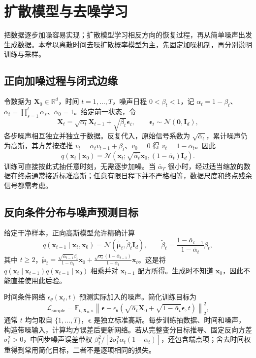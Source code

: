 \setcounter{chapter}{20} %
\chapter{扩散模型与去噪学习}
\label{chap:dl-diffusion}
把数据逐步加噪容易实现；扩散模型学习相反方向的恢复过程，再从简单噪声出发生成数据。本章以离散时间去噪扩散概率模型为主\cite{ho2020}，先固定加噪机制，再分别说明训练与采样。

\section{正向加噪过程与闭式边缘}
令数据为 $\mathbf X_0\in\mathbb R^d$，时间 $t=1,\ldots,T$，噪声日程 $0<\beta_t<1$，记 $\alpha_t=1-\beta_t$、$\bar\alpha_t=\prod_{s=1}^t\alpha_s$、$\bar\alpha_0=1$。给定前一状态，令
\[
\mathbf X_t=\sqrt{\alpha_t}\mathbf X_{t-1}+\sqrt{\beta_t}\boldsymbol\epsilon_t,
\qquad \boldsymbol\epsilon_t\sim\mathcal N(\mathbf0,\mathbf I_d),
\]
各步噪声相互独立并独立于数据。反复代入，原始信号系数为 $\sqrt{\bar\alpha_t}$，累计噪声仍为高斯，其方差按递推 $v_t=\alpha_tv_{t-1}+\beta_t$、$v_0=0$ 得 $v_t=1-\bar\alpha_t$。因此
\begin{equation}
q(\mathbf x_t\mid\mathbf x_0)=\mathcal N(\mathbf x_t;\sqrt{\bar\alpha_t}\mathbf x_0,(1-\bar\alpha_t)\mathbf I_d).
\label{eq:dl-diffusion-forward}
\end{equation}
训练可直接按此式抽任意时刻，无需逐步加噪。当 $\bar\alpha_T$ 很小时，经过适当缩放的数据在终点通常接近标准高斯；任意有限日程下并不严格相等，数据尺度和终点残余信号都需考虑。

\section{反向条件分布与噪声预测目标}
给定干净样本，正向高斯模型允许精确计算
\[
q(\mathbf x_{t-1}\mid\mathbf x_t,\mathbf x_0)=\mathcal N(\widetilde{\boldsymbol\mu}_t,\widetilde\beta_t\mathbf I_d),\qquad
\widetilde\beta_t=\frac{1-\bar\alpha_{t-1}}{1-\bar\alpha_t}\beta_t,
\]
其中 $t\geq2$，$\widetilde{\boldsymbol\mu}_t=\frac{\sqrt{\bar\alpha_{t-1}}\beta_t}{1-\bar\alpha_t}\mathbf x_0+\frac{\sqrt{\alpha_t}(1-\bar\alpha_{t-1})}{1-\bar\alpha_t}\mathbf x_t$。这是将 $q(\mathbf x_t\mid\mathbf x_{t-1})q(\mathbf x_{t-1}\mid\mathbf x_0)$ 相乘并对 $\mathbf x_{t-1}$ 配方所得。生成时不知道 $\mathbf x_0$，因此不能直接使用此后验。

时间条件网络 $\epsilon_\theta(\mathbf x_t,t)$ 预测实际加入的噪声。简化训练目标为
\begin{equation}
\mathcal L_{\mathrm{simple}}=\mathbb E_{t,\mathbf X_0,\boldsymbol\epsilon}
\left\|\boldsymbol\epsilon-\epsilon_\theta(\sqrt{\bar\alpha_t}\mathbf X_0+\sqrt{1-\bar\alpha_t}\boldsymbol\epsilon,t)\right\|_2^2,
\label{eq:dl-diffusion-loss}
\end{equation}
通常 $t$ 均匀取自 $\{1,\ldots,T\}$，$\boldsymbol\epsilon$ 是独立标准高斯。每步训练抽数据、时间和噪声，构造带噪输入，计算均方误差后更新网络。若从完整变分目标推导、固定反向方差 $\sigma_t^2>0$，中间步噪声误差带权 $\beta_t^2/[2\sigma_t^2\alpha_t(1-\bar\alpha_t)]$，还包含端点项；舍去时间权重得到常用简化目标，二者不是逐项相同的损失。

